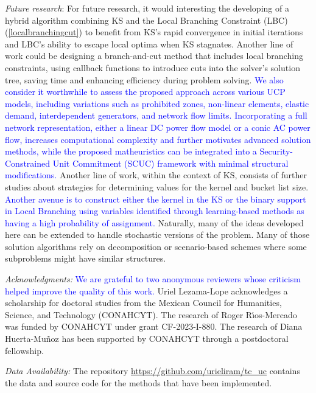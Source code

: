 \noindent\textit{Future research}:
For future research, it would interesting the developing of a hybrid algorithm combining KS and the Local Branching Constraint (LBC) (\ref{localbranchingcut}) to benefit from KS's rapid convergence in initial iterations and LBC's ability to escape local optima when KS stagnates. Another
line of work could be designing a branch-and-cut method that includes local branching constraints, using callback functions to introduce cuts into the solver's solution tree, saving time and enhancing efficiency during problem solving.
\textcolor{blue}{We also consider it worthwhile to assess the proposed approach across various UCP models, including variations such as prohibited zones, non-linear elements, elastic demand, interdependent generators, and network flow limits. Incorporating a full network representation, either a linear DC power flow model or a conic AC power flow, increases computational complexity and further motivates advanced solution methods, while the proposed matheuristics can be integrated into a Security-Constrained Unit Commitment (SCUC) framework with minimal structural modifications.}
%
%
Another line of work, within the context of KS, consists of further studies about strategies for determining values for the kernel and bucket list size. \textcolor{blue}{Another avenue is to construct either the kernel in the KS or the binary support in Local Branching using variables identified through learning-based methods as having a high probability of assignment.} 
%
Naturally, many of the ideas developed here can be extended to handle stochastic versions of the problem.  Many of those solution algorithms rely on decomposition or scenario-based schemes where some subproblems might have similar structures.


\vspace{1em}
\noindent
\textit{Acknowledgments:}
\textcolor{blue}{We are grateful to two anonymous reviewers whose
criticism helped improve the quality of this work.}
Uriel Lezama-Lope acknowledges a scholarship for doctoral studies from the Mexican Council for Humanities, Science, and Technology (CONAHCYT).
The research of Roger R\'{\i}os-Mercado was funded
by CONAHCYT under grant CF-2023-I-880.
The research of Diana Huerta-Mu\~noz has been supported by CONAHCYT through a postdoctoral fellowship.

\vspace{1em}
\noindent\textit{Data Availability:} The repository \url{https://github.com/urieliram/tc_uc} contains the data and source code for the methods that have been implemented.

